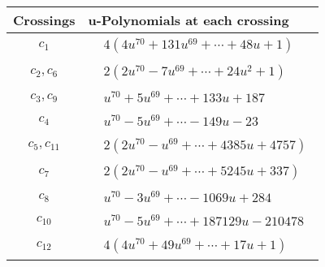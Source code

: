 \documentclass[1p]{elsarticle_modified}
\theoremstyle{definition}
\begin{document}
\begin{tabular}{m{50pt}|m{274pt}}
Crossings & \hspace{64pt}u-Polynomials at each crossing \\
\hline $$\begin{aligned}c_{1}\end{aligned}$$&$\begin{aligned}
&4(4 u^{70}+131 u^{69}+\cdots+48 u+1)
\end{aligned}$\\
\hline $$\begin{aligned}c_{2},c_{6}\end{aligned}$$&$\begin{aligned}
&2(2 u^{70}-7 u^{69}+\cdots+24 u^2+1)
\end{aligned}$\\
\hline $$\begin{aligned}c_{3},c_{9}\end{aligned}$$&$\begin{aligned}
&u^{70}+5 u^{69}+\cdots+133 u+187
\end{aligned}$\\
\hline $$\begin{aligned}c_{4}\end{aligned}$$&$\begin{aligned}
&u^{70}-5 u^{69}+\cdots-149 u-23
\end{aligned}$\\
\hline $$\begin{aligned}c_{5},c_{11}\end{aligned}$$&$\begin{aligned}
&2(2 u^{70}- u^{69}+\cdots+4385 u+4757)
\end{aligned}$\\
\hline $$\begin{aligned}c_{7}\end{aligned}$$&$\begin{aligned}
&2(2 u^{70}- u^{69}+\cdots+5245 u+337)
\end{aligned}$\\
\hline $$\begin{aligned}c_{8}\end{aligned}$$&$\begin{aligned}
&u^{70}-3 u^{69}+\cdots-1069 u+284
\end{aligned}$\\
\hline $$\begin{aligned}c_{10}\end{aligned}$$&$\begin{aligned}
&u^{70}-5 u^{69}+\cdots+187129 u-210478
\end{aligned}$\\
\hline $$\begin{aligned}c_{12}\end{aligned}$$&$\begin{aligned}
&4(4 u^{70}+49 u^{69}+\cdots+17 u+1)
\end{aligned}$\\
\hline
\end{tabular}\\~\\
\end{document}
